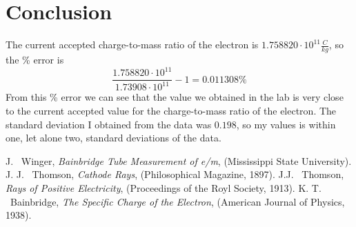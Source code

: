 \documentclass[aps,prl,10pt,twocolumn,floatfix]{revtex4-2}
\begin{document}
\section{Conclusion}
The current accepted charge-to-mass ratio of the electron is $1.758820\cdot10^{11}\frac{C}{kg}$, so the \% error is
\begin{equation}
	\frac{1.758820\cdot10^{11}}{1.73908\cdot10^{11}} -1=0.011308\%
\end{equation}
From this \% error we can see that the value we obtained in the lab is very close to the current accepted value for the charge-to-mass ratio of the electron. 
The standard deviation I obtained from the data was $0.198$, so my values is within one, let alone two, standard deviations of the data. 

\begin{thebibliography}{9}
 J. ~Winger, \textit{Bainbridge Tube Measurement of e/m}, (Mississippi State University).
 J. J. ~Thomson, \textit{Cathode Rays}, (Philosophical Magazine, 1897).
 J.J. ~Thomson, \textit{Rays of Positive Electricity}, (Proceedings of the Royl Society, 1913).
 K. T. ~Bainbridge, \textit{The Specific Charge of the Electron}, (American Journal of Physics, 1938).
\end{thebibliography}
\end{document}
